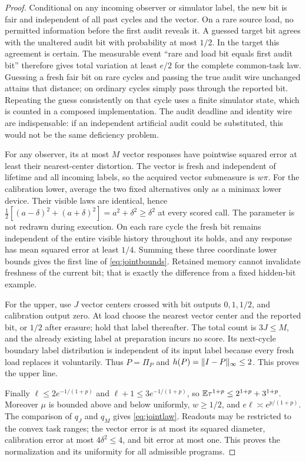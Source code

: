 \begin{proof}
Conditional on any incoming observer or simulator label, the new bit is fair and independent of all past cycles and the vector. On a rare source load, no permitted information before the first audit reveals it. A guessed target bit agrees with the unaltered audit bit with probability at most $1/2$. In the target this agreement is certain. The measurable event ``rare and load bit equals first audit bit'' therefore gives total variation at least $e/2$ for the complete common-task law. Guessing a fresh fair bit on rare cycles and passing the true audit wire unchanged attains that distance; on ordinary cycles simply pass through the reported bit. Repeating the guess consistently on that cycle uses a finite simulator state, which is counted in a composed implementation. The audit deadline and identity wire are indispensable: if an independent artificial audit could be substituted, this would not be the same deficiency problem.

For any observer, its at most $M$ vector responses have pointwise squared error at least their nearest-center distortion. The vector is fresh and independent of lifetime and all incoming labels, so the acquired vector submeasure is $w\pi$. For the calibration lower, average the two fixed alternatives only as a minimax lower device. Their visible laws are identical, hence
$\tfrac12[(a-\delta)^2+(a+\delta)^2]=a^2+\delta^2\ge\delta^2$
at every scored call. The parameter is not redrawn during execution. On each rare cycle the fresh bit remains independent of the entire visible history throughout its holds, and any response has mean squared error at least $1/4$. Summing these three coordinate lower bounds gives the first line of \eqref{eq:jointbounds}. Retained memory cannot invalidate freshness of the current bit; that is exactly the difference from a fixed hidden-bit example.

For the upper, use $J$ vector centers crossed with bit outputs $0,1,1/2$, and calibration output zero. At load choose the nearest vector center and the reported bit, or $1/2$ after erasure; hold that label thereafter. The total count is $3J\le M$, and the already existing label at preparation incurs no score. Its next-cycle boundary label distribution is independent of its input label because every fresh load replaces it voluntarily. Thus $P=\Pi_P$ and $h(P)=\lVert I-P\rVert_\infty\le2$. This proves the upper line.

Finally $\ell\le2e^{-1/(1+p)}$ and $\ell+1\le3e^{-1/(1+p)}$, so
$\mathbb E\tau^{1+p}\le2^{1+p}+3^{1+p}$.
Moreover $\mu$ is bounded above and below uniformly, $w\ge1/2$, and $e\ell\asymp e^{p/(1+p)}$. The comparison of $q_J$ and $q_M$ gives \eqref{eq:jointlaw}. Readouts may be restricted to the convex task ranges; the vector error is at most its squared diameter, calibration error at most $4\delta^2\le4$, and bit error at most one. This proves the normalization and its uniformity for all admissible programs.
\end{proof}

